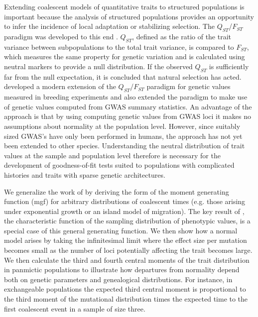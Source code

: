 Extending coalescent models of quantitative traits to structured populations is
important because the analysis of structured populations provides an opportunity
to infer the incidence of local adaptation or stabilizing selection. The
$Q_{ST}$/$F_{ST}$ paradigm was developed to this end
\citep{Spitze1993,Whitlock2008,Leinonen2013}. $Q_{ST}$, defined as the ratio of the trait
variance between subpopulations to the total trait variance, is compared to
$F_{ST}$, which measures the same property for genetic variation and is
calculated using neutral markers to provide a null distribution. If the observed
$Q_{ST}$ is sufficiently far from the null expectation, it is concluded that
natural selection has acted. \citet{Ovaskainen2011} developed a modern extension
of the $Q_{ST}$/$F_{ST}$ paradigm for genetic values measured in breeding
experiments and \citet{Berg2014} also extended the paradigm to make use of
genetic values computed from GWAS summary statistics. An advantage of the
\citet{Berg2014} approach is that by using computing genetic values from GWAS
loci it makes no assumptions about normality at the population level. However,
since suitably sized GWAS's have only been performed in humans, the approach has
not yet been extended to other species. Understanding the neutral distribution
of trait values at the sample and population level therefore is necessary for
the development of goodness-of-fit tests suited to populations with complicated
histories and traits with sparse genetic architectures.

We generalize the work of \citet{Schraiber2015} by deriving the form of the
moment generating function (mgf) for arbitrary distributions of coalescent times
(e.g. those arising under exponential growth or an island model of migration).
The key result of \citet{Schraiber2015}, the characteristic function of the
sampling distribution of phenotypic values, is a special case of this general
generating function. We then show how a normal model arises by taking the
infinitesimal limit where the effect size per mutation becomes small as the
number of loci potentially affecting the trait becomes large. We then calculate
the third and fourth central moments of the trait distribution in panmictic
populations to illustrate how departures from normality depend both on genetic
parameters and genealogical distributions. For instance, in exchangeable
populations the expected third central moment is proportional to the third
moment of the mutational distribution times the expected time to the first
coalescent event in a sample of size three.

